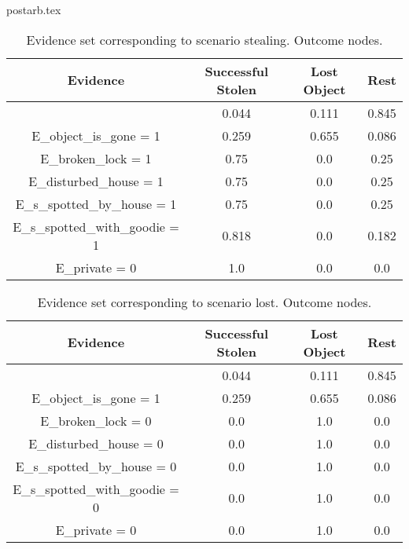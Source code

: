 postarb.tex\begin{table}\begin{tabular}{c|c|c|c}Evidence & Successful Stolen & Lost Object & Rest \\\hline & 0.044 & 0.111 & 0.845 \\E\_object\_is\_gone = 1 & 0.259 & 0.655 & 0.086 \\E\_broken\_lock = 1 & 0.75 & 0.0 & 0.25 \\E\_disturbed\_house = 1 & 0.75 & 0.0 & 0.25 \\E\_s\_spotted\_by\_house = 1 & 0.75 & 0.0 & 0.25 \\E\_s\_spotted\_with\_goodie = 1 & 0.818 & 0.0 & 0.182 \\E\_private = 0 & 1.0 & 0.0 & 0.0 \\\end{tabular}\caption{Evidence set corresponding to scenario stealing. Outcome nodes.}\end{table}
\begin{table}\begin{tabular}{c|c|c|c}Evidence & Successful Stolen & Lost Object & Rest \\\hline & 0.044 & 0.111 & 0.845 \\E\_object\_is\_gone = 1 & 0.259 & 0.655 & 0.086 \\E\_broken\_lock = 0 & 0.0 & 1.0 & 0.0 \\E\_disturbed\_house = 0 & 0.0 & 1.0 & 0.0 \\E\_s\_spotted\_by\_house = 0 & 0.0 & 1.0 & 0.0 \\E\_s\_spotted\_with\_goodie = 0 & 0.0 & 1.0 & 0.0 \\E\_private = 0 & 0.0 & 1.0 & 0.0 \\\end{tabular}\caption{Evidence set corresponding to scenario lost. Outcome nodes.}\end{table}